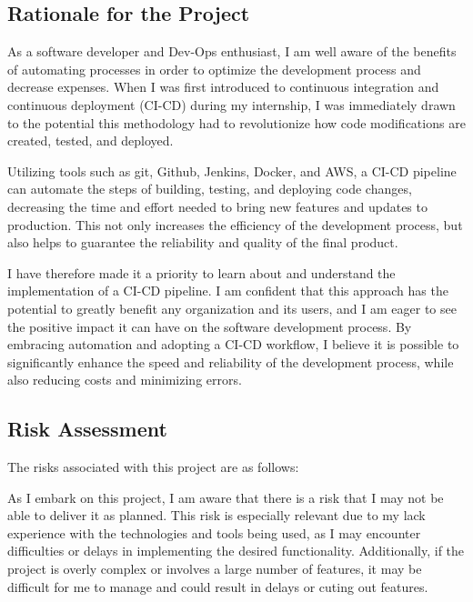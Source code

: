 \documentclass[
  10pt,
  paper=a4,
  ,captions=tableheading
]{scrartcl}
\begin{document}
\hypertarget{rationale-for-the-project}{%
\subsection{Rationale for the Project}\label{rationale-for-the-project}}

As a software developer and Dev-Ops enthusiast, I am well aware of the
benefits of automating processes in order to optimize the development
process and decrease expenses. When I was first introduced to continuous
integration and continuous deployment (CI-CD) during my internship, I
was immediately drawn to the potential this methodology had to
revolutionize how code modifications are created, tested, and deployed.

Utilizing tools such as git, Github, Jenkins, Docker, and AWS, a CI-CD
pipeline can automate the steps of building, testing, and deploying code
changes, decreasing the time and effort needed to bring new features and
updates to production. This not only increases the efficiency of the
development process, but also helps to guarantee the reliability and
quality of the final product.

I have therefore made it a priority to learn about and understand the
implementation of a CI-CD pipeline. I am confident that this approach
has the potential to greatly benefit any organization and its users, and
I am eager to see the positive impact it can have on the software
development process. By embracing automation and adopting a CI-CD
workflow, I believe it is possible to significantly enhance the speed
and reliability of the development process, while also reducing costs
and minimizing errors.

\hypertarget{risk-assessment}{%
\subsection{Risk Assessment}\label{risk-assessment}}

The risks associated with this project are as follows:

As I embark on this project, I am aware that there is a risk that I may
not be able to deliver it as planned. This risk is especially relevant
due to my lack experience with the technologies and tools being used, as
I may encounter difficulties or delays in implementing the desired
functionality. Additionally, if the project is overly complex or
involves a large number of features, it may be difficult for me to
manage and could result in delays or cuting out features.
\end{document}
